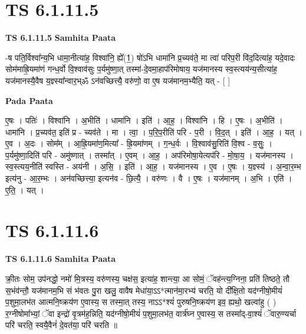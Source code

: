\documentclass[17pt]{extarticle}
\begin{document}

\section{ TS 6.1.11.5 }

\textbf{TS 6.1.11.5 } \newline
\textbf{Samhita Paata} \newline

-ष पति॒र्विश्वा᳚न्य॒भि धामा॒नीत्या॑ह॒ विश्वा॑नि॒ ह्ये᳚(1॒) षो॑ऽभि धामा॑नि प्र॒च्यव॑ते॒ मा त्वा॑ परिप॒री वि॑द॒दित्या॑ह॒ यदे॒वादः सोम॑माह्रि॒यमा॑णं गन्ध॒र्वो वि॒श्वाव॑सुः प॒र्यमु॑ष्णा॒त् तस्मा॑-दे॒वमा॒हाप॑रिमोषाय॒ यज॑मानस्य स्व॒स्त्यय॑न्य॒सीत्या॑ह॒ यज॑मानस्यै॒वैष य॒ज्ञ्स्या᳚न्वार॒भ्ॐ ऽन॑वच्छित्त्यै॒ वरु॑णो॒ वा ए॒ष यज॑मानम॒भ्यैति॒ यत् - [  ] \newline

\textbf{Pada Paata} \newline

ए॒षः । पतिः॑ । विश्वा॑नि । अ॒भीति॑ । धामा॑नि । इति॑ । आ॒ह॒ । विश्वा॑नि । हि । ए॒षः । अ॒भीति॑ । धामा॑नि । प्र॒च्यव॑त॒ इति॑ प्र - च्यव॑ते । मा । त्वा॒ । प॒रि॒प॒रीति॑ परि - प॒री । वि॒द॒त् । इति॑ । आ॒ह॒ । यत् । ए॒व । अ॒दः । सोम᳚म् । आ॒ह्रि॒यमा॑ण॒मित्या᳚ - ह्रि॒यमा॑णम् । ग॒न्ध॒र्वः । वि॒श्वाव॑सु॒रिति॑ वि॒श्व - व॒सुः॒ । प॒र्यमु॑ष्णा॒दिति॑ परि - अमु॑ष्णात् । तस्मा᳚त् । ए॒वम् । आ॒ह॒ । अप॑रिमोषा॒येत्यप॑रि - मो॒षा॒य॒ । यज॑मानस्य । स्व॒स्त्यय॒नीति॑ स्वस्ति - अय॑नी । अ॒सि॒ । इति॑ । आ॒ह॒ । यज॑मानस्य । ए॒व । ए॒षः । य॒ज्ञ्स्य॑ । अ॒न्वा॒र॒म्भ इत्य॑नु - आ॒र॒म्भः । अन॑वच्छित्त्या॒ इत्यन॑व - छि॒त्यै॒ । वरु॑णः । वै । ए॒षः । यज॑मानम् । अ॒भि । एति॑ । ए॒ति॒ । यत् ।  \newline





\section{ TS 6.1.11.6 }

\textbf{TS 6.1.11.6 } \newline
\textbf{Samhita Paata} \newline

क्री॒तः सोम॒ उप॑नद्धो॒ नमो॑ मि॒त्रस्य॒ वरु॑णस्य॒ चक्ष॑स॒ इत्या॑ह॒ शान्त्या॒ आ सोमं॒ ॅवह॑न्त्य॒ग्निना॒ प्रति॑ तिष्ठते॒ तौ स॒भंव॑न्तौ॒ यज॑मानम॒भि सं भ॑वतः पु॒रा खलु॒ वावैष मेधा॑या॒ऽऽ*त्मान॑मा॒रभ्य॑ चरति॒ यो दी᳚क्षि॒तो यद॑ग्नीषो॒मीयं॑ प॒शुमा॒लभ॑त आत्मनि॒ष्क्रय॑ण ए॒वास्य॒ स तस्मा॒त् तस्य॒ नाऽऽ*श्यं॑ पुरुषनि॒ष्क्रय॑ण इव॒ ह्यथो॒ खल्वा॑हु ( ) र॒ग्नीषोमा᳚भ्यां॒ ॅवा इन्द्रो॑ वृ॒त्रम॑ह॒न्निति॒ यद॑ग्नीषो॒मीयं॑ प॒शुमा॒लभ॑त॒ वार्त्र॑घ्न ए॒वास्य॒ स तस्मा᳚द्-वा॒श्यं॑ ॅवारु॒ण्यर्चा परि॑ चरति॒ स्वयै॒वैनं॑ दे॒वत॑या॒ परि॑ चरति ॥ \newline
\end{document}
